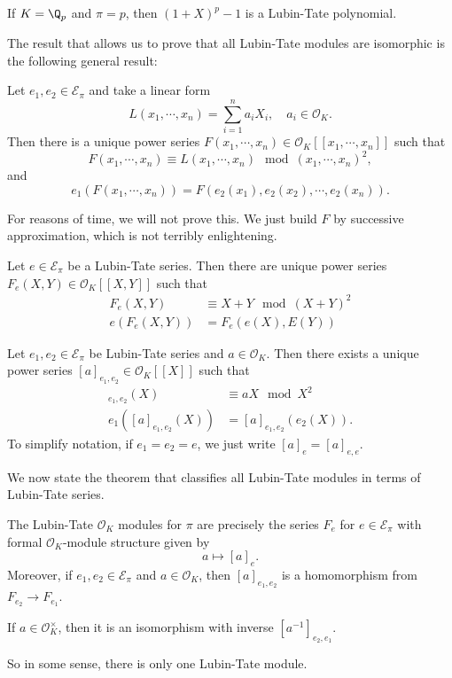 \documentclass[a4paper]{article}
\begin{document}
\begin{eg}
  If $K = \Q_p$ and $\pi = p$, then $(1 + X)^p - 1$ is a Lubin-Tate polynomial.
\end{eg}

The result that allows us to prove that all Lubin-Tate modules are isomorphic is the following general result:
\begin{lemma}
  Let $e_1, e_2 \in \mathcal{E}_\pi$ and take a linear form
  \[
    L(x_1, \cdots, x_n) = \sum_{i = 1}^n a_i X_i, \quad a_i \in \mathcal{O}_K.
  \]
  Then there is a unique power series $F(x_1, \cdots, x_n) \in \mathcal{O}_K[[x_1, \cdots, x_n]]$ such that
  \[
    F(x_1, \cdots, x_n) \equiv L(x_1, \cdots, x_n)\mod (x_1, \cdots, x_n)^2,
  \]
  and
  \[
    e_1(F(x_1, \cdots, x_n)) = F(e_2(x_1), e_2(x_2), \cdots, e_2(x_n)).
  \]
\end{lemma}
For reasons of time, we will not prove this. We just build $F$ by successive approximation, which is not terribly enlightening.

\begin{cor}
  Let $e \in \mathcal{E}_\pi$ be a Lubin-Tate series. Then there are unique power series $F_e(X, Y) \in \mathcal{O}_K[[X, Y]]$ such that
  \begin{align*}
    F_e(X, Y) &\equiv X + Y \mod (X + Y)^2\\
    e(F_e(X, Y)) &= F_e(e(X), E(Y))
  \end{align*}
\end{cor}

\begin{cor}
  Let $e_1, e_2 \in \mathcal{E}_\pi$ be Lubin-Tate series and $a \in \mathcal{O}_K$. Then there exists a unique power series $[a]_{e_1, e_2} \in \mathcal{O}_K[[X]]$ such that
  \begin{align*}
    [a]_{e_1, e_2}(X) &\equiv aX \mod X^2\\
    e_1([a]_{e_1, e_2}(X)) &= [a]_{e_1, e_2}(e_2(X)).
  \end{align*}
  To simplify notation, if $e_1 = e_2 = e$, we just write $[a]_e = [a]_{e, e}$.
\end{cor}

We now state the theorem that classifies all Lubin-Tate modules in terms of Lubin-Tate series.
\begin{thm}
  The Lubin-Tate $\mathcal{O}_K$ modules for $\pi$ are precisely the series $F_e$ for $e \in \mathcal{E}_\pi$ with formal $\mathcal{O}_K$-module structure given by
  \[
    a \mapsto [a]_e.
  \]
  Moreover, if $e_1, e_2 \in \mathcal{E}_\pi$ and $a \in \mathcal{O}_K$, then $[a]_{e_1, e_2}$ is a homomorphism from $F_{e_2} \to F_{e_1}$.

  If $a \in \mathcal{O}_K^\times$, then it is an isomorphism with inverse $[a^{-1}]_{e_2, e_1}$.
\end{thm}
So in some sense, there is only one Lubin-Tate module.
\end{document}
